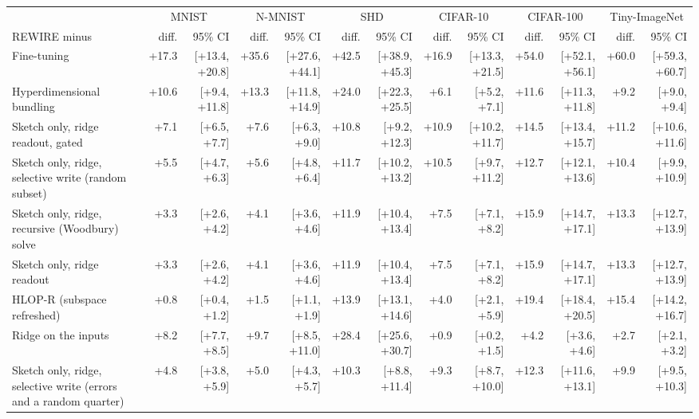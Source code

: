 \begin{tabular*}{\textheight}{@{\extracolsep{\fill}}lrrrrrrrrrrrr@{}}
\toprule
 & \multicolumn{2}{c}{MNIST} & \multicolumn{2}{c}{N-MNIST} & \multicolumn{2}{c}{SHD} & \multicolumn{2}{c}{CIFAR-10} & \multicolumn{2}{c}{CIFAR-100} & \multicolumn{2}{c}{Tiny-ImageNet} \\
\cmidrule(lr){2-3}\cmidrule(lr){4-5}\cmidrule(lr){6-7}\cmidrule(lr){8-9}\cmidrule(lr){10-11}\cmidrule(lr){12-13}
REWIRE minus & diff. & 95\% CI & diff. & 95\% CI & diff. & 95\% CI & diff. & 95\% CI & diff. & 95\% CI & diff. & 95\% CI \\
\midrule
Fine-tuning & +17.3 & [+13.4, +20.8] & +35.6 & [+27.6, +44.1] & +42.5 & [+38.9, +45.3] & +16.9 & [+13.3, +21.5] & +54.0 & [+52.1, +56.1] & +60.0 & [+59.3, +60.7] \\
Hyperdimensional bundling & +10.6 & [+9.4, +11.8] & +13.3 & [+11.8, +14.9] & +24.0 & [+22.3, +25.5] & +6.1 & [+5.2, +7.1] & +11.6 & [+11.3, +11.8] & +9.2 & [+9.0, +9.4] \\
Sketch only, ridge readout, gated & +7.1 & [+6.5, +7.7] & +7.6 & [+6.3, +9.0] & +10.8 & [+9.2, +12.3] & +10.9 & [+10.2, +11.7] & +14.5 & [+13.4, +15.7] & +11.2 & [+10.6, +11.6] \\
Sketch only, ridge, selective write (random subset) & +5.5 & [+4.7, +6.3] & +5.6 & [+4.8, +6.4] & +11.7 & [+10.2, +13.2] & +10.5 & [+9.7, +11.2] & +12.7 & [+12.1, +13.6] & +10.4 & [+9.9, +10.9] \\
Sketch only, ridge, recursive (Woodbury) solve & +3.3 & [+2.6, +4.2] & +4.1 & [+3.6, +4.6] & +11.9 & [+10.4, +13.4] & +7.5 & [+7.1, +8.2] & +15.9 & [+14.7, +17.1] & +13.3 & [+12.7, +13.9] \\
Sketch only, ridge readout & +3.3 & [+2.6, +4.2] & +4.1 & [+3.6, +4.6] & +11.9 & [+10.4, +13.4] & +7.5 & [+7.1, +8.2] & +15.9 & [+14.7, +17.1] & +13.3 & [+12.7, +13.9] \\
HLOP-R (subspace refreshed) & +0.8 & [+0.4, +1.2] & +1.5 & [+1.1, +1.9] & +13.9 & [+13.1, +14.6] & +4.0 & [+2.1, +5.9] & +19.4 & [+18.4, +20.5] & +15.4 & [+14.2, +16.7] \\
Ridge on the inputs & +8.2 & [+7.7, +8.5] & +9.7 & [+8.5, +11.0] & +28.4 & [+25.6, +30.7] & +0.9 & [+0.2, +1.5] & +4.2 & [+3.6, +4.6] & +2.7 & [+2.1, +3.2] \\
Sketch only, ridge, selective write (errors and a random quarter) & +4.8 & [+3.8, +5.9] & +5.0 & [+4.3, +5.7] & +10.3 & [+8.8, +11.4] & +9.3 & [+8.7, +10.0] & +12.3 & [+11.6, +13.1] & +9.9 & [+9.5, +10.3] \\

\end{tabular*}
